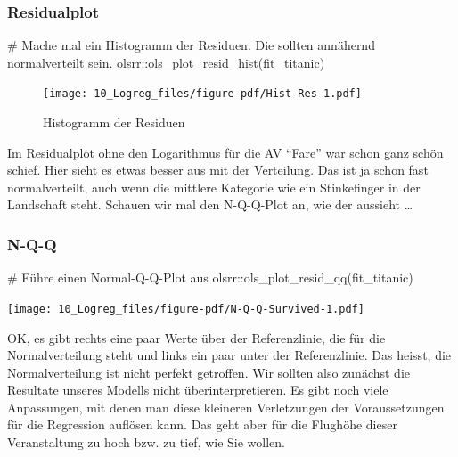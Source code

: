 \documentclass[
  10pt,
  letterpaper,
  a4paper, twoside]{scrreprt}
\newenvironment{Shaded}{\begin{snugshade}}{\end{snugshade}}
\newcommand{\CommentTok}[1]{\textcolor[rgb]{0.37,0.37,0.37}{#1}}
\newcommand{\FunctionTok}[1]{\textcolor[rgb]{0.28,0.35,0.67}{#1}}
\newcommand{\NormalTok}[1]{\textcolor[rgb]{0.00,0.23,0.31}{#1}}
\newcommand{\SpecialCharTok}[1]{\textcolor[rgb]{0.37,0.37,0.37}{#1}}
\begin{document}
\subsubsection{Residualplot}\label{residualplot}

\begin{Shaded}
\begin{Highlighting}[]

\CommentTok{\# Mache mal ein Histogramm der Residuen. Die sollten annähernd normalverteilt sein. }
\NormalTok{olsrr}\SpecialCharTok{::}\FunctionTok{ols\_plot\_resid\_hist}\NormalTok{(fit\_titanic)}
\end{Highlighting}
\end{Shaded}

\begin{figure}[H]

{\centering \texttt{[image: 10\_Logreg\_files/figure-pdf/Hist-Res-1.pdf]}

}

\caption{Histogramm der Residuen}

\end{figure}%

Im Residualplot ohne den Logarithmus für die AV \enquote{Fare} war schon
ganz schön schief. Hier sieht es etwas besser aus mit der Verteilung.
Das ist ja schon fast normalverteilt, auch wenn die mittlere Kategorie
wie ein Stinkefinger in der Landschaft steht. Schauen wir mal den
N-Q-Q-Plot an, wie der aussieht \ldots{}

\subsubsection{N-Q-Q}\label{n-q-q}

\begin{Shaded}
\begin{Highlighting}[]
\CommentTok{\# Führe einen Normal{-}Q{-}Q{-}Plot aus}
\NormalTok{olsrr}\SpecialCharTok{::}\FunctionTok{ols\_plot\_resid\_qq}\NormalTok{(fit\_titanic)}
\end{Highlighting}
\end{Shaded}

\texttt{[image: 10\_Logreg\_files/figure-pdf/N-Q-Q-Survived-1.pdf]}

OK, es gibt rechts eine paar Werte über der Referenzlinie, die für die
Normalverteilung steht und links ein paar unter der Referenzlinie. Das
heisst, die Normalverteilung ist nicht perfekt getroffen. Wir sollten
also zunächst die Resultate unseres Modells nicht überinterpretieren. Es
gibt noch viele Anpassungen, mit denen man diese kleineren Verletzungen
der Voraussetzungen für die Regression auflösen kann. Das geht aber für
die Flughöhe dieser Veranstaltung zu hoch bzw. zu tief, wie Sie wollen.
\end{document}
